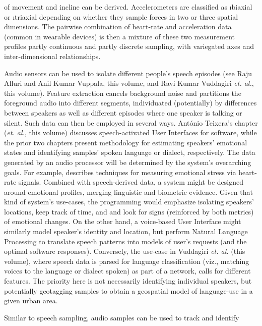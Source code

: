 {\begin{description}
of movement and incline can be derived.  Accelerometers are 
classified as \i{biaxial} or \i{triaxial} depending on 
whether they sample forces in two or three spatial 
dimensions.  
The pairwise combination of heart-rate and acceleration data
(common in wearable devices) is then a mixture of these
two measurement profiles \mdash{} partly continuous and
partly discrete sampling, with variegated axes and
inter-dimensional relationships.  
\item[Speech Sampling]  Audio sensors can be used to 
isolate different people's speech episodes (see Raju Alluri 
and Anil Kumar Vuppala, this volume, and 
Ravi Kumar Vuddagiri \textit{et. al.}, this volume).  Feature 
extraction cancels background noise and partitions the foreground 
audio into different segments, individuated (potentially) by 
differences between speakers as well as different episodes 
where one speaker is talking or silent.  Such data can 
then be employed in several ways.  Ant\'onio Teixera's chapter 
(\textit{et. al.}, this volume) discusses 
speech-activated User Interfaces for 
software, while the prior two chapters present methodology for 
estimating speakers' emotional states and 
identifying samples' spoken language or dialect, 
respectively.  The data generated by 
an audio processor will be determined by the system's 
overarching goals.  For example, \cite{JongyoonChoi} describes 
techniques for measuring emotional stress via heart-rate signals.  
Combined with speech-derived data, a system might be designed 
around emotional profiles, merging linguistic and 
biometric evidence.  Given that kind of system's 
use-cases, the programming would emphasize 
isolating speakers' locations, keep track of time, and 
and look for signs (reinforced by both metrics) of 
emotional changes.  On the other hand, a voice-based 
User Interface might similarly model speaker's identity 
and location, but perform Natural Language Processing 
to translate speech patterns into models of user's 
requests (and the optimal software responses).       
Conversely, the use-case in Vuddagiri \textit{et. al.} 
(this volume), where speech data is parsed for language 
classification (viz., matching voices to the language 
or dialect spoken) as part of a  network, 
calls for different features.    
The priority here is not necessarily identifying individual 
speakers, but potentially geotagging samples to obtain a geospatial model of 
language-use in a given urban area. 
\item[Bioacoustic Sampling]  Similar to speech sampling, 
audio samples can be used to track and identify 

\end{description}}
